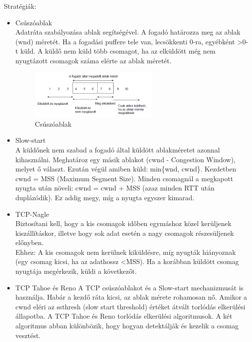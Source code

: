 \documentclass[margin=0px]{article}
\begin{document}
\begin{description}
        Stratégiák:
        \begin{itemize}
            \item Csúszóablak \\
                  Adatráta szabályozása ablak segítségével. A fogadó határozza meg az ablak (wnd) méretét. Ha a fogadási puffere tele van, lecsökkenti 0-ra, egyébként \textgreater0-t küld. A küldő nem küld több csomagot, ha az elküldött még nem nyugtázott csomagok száma elérte az ablak méretét.
                  \begin{figure}[H]
                      \centering
                      \includegraphics[width=0.6\textwidth]{img/csuszoablak.png}
                      \caption{Csúszóablak}
                  \end{figure}
            \item Slow-start \\
                  A küldőnek nem szabad a fogadó által küldött ablakméretet azonnal kihasználni. Meghatároz egy másik ablakot (cwnd - Congestion Window), melyet ő választ. Ezután végül amiben küld: min\{wnd, cwnd\}. Kezdetben cwnd = MSS (Maximum Segment Size). Minden csomagnál a megkapott nyugta után növeli: cwnd = cwnd + MSS (azaz minden RTT után duplázódik). Ez addig megy, míg a nyugta egyszer kimarad.
            \item TCP-Nagle \\
                  Biztosítani kell, hogy a kis csomagok időben egymáshoz közel kerüljenek kiszállításkor, illetve hogy sok adat esetén a nagy csomagok részesüljenek előnyben. \\
                  Ehhez: A kis csomagok nem kerülnek kiküldésre, míg nyugták hiányoznak (egy csomag kicsi, ha az adathossz \textless MSS). Ha a korábban küldött csomag nyugtája megérkezik, küldi a következőt.
            \item TCP Tahoe és Reno
                  A TCP csúszóablakot és a Slow-start mechanizmusát is használja. Habár a kezdő ráta kicsi, az ablak mérete rohamosan nő. Amikor a cwnd eléri az ssthresh (slow start threshold) értéket átvált torlódás elkerülési állapotba. A TCP Tahoe és Reno torlódás elkerülési algoritmusok. A két algoritmus abban különbözik, hogy hogyan detektálják és kezelik a csomag vesztést. \\

\end{itemize}
\end{description}
\end{document}
